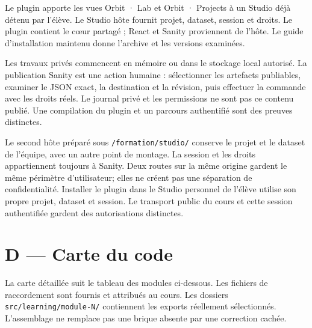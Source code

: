 \documentclass[
  canadien,
  11pt,
  a4paper,
]{report}
\begin{document}
Le plugin apporte les vues Orbit · Lab et Orbit · Projects à un Studio
déjà détenu par l'élève. Le Studio hôte fournit projet, dataset, session
et droits. Le plugin contient le cœur partagé ; React et Sanity
proviennent de l'hôte. Le guide d'installation maintenu donne l'archive
et les versions examinées.

Les travaux privés commencent en mémoire ou dans le stockage local
autorisé. La publication Sanity est une action humaine : sélectionner
les artefacts publiables, examiner le JSON exact, la destination et la
révision, puis effectuer la commande avec les droits réels. Le journal
privé et les permissions ne sont pas ce contenu publié. Une compilation
du plugin et un parcours authentifié sont des preuves distinctes.

Le second hôte préparé sous \texttt{/\allowbreak{}formation/\allowbreak{}studio/\allowbreak{}} conserve le
projet et le dataset de l'équipe, avec un autre point de montage. La
session et les droits appartiennent toujours à Sanity. Deux routes sur
la même origine gardent le même périmètre d'utilisateur; elles ne créent
pas une séparation de confidentialité. Installer le plugin dans le
Studio personnel de l'élève utilise son propre projet, dataset et
session. Le transport public du cours et cette session authentifiée
gardent des autorisations distinctes.

\section{D --- Carte du code}\label{d-carte-du-code}

La carte détaillée suit le tableau des modules ci-dessous. Les fichiers
de raccordement sont fournis et attribués au cours. Les dossiers
\texttt{src/\allowbreak{}learning/\allowbreak{}module-N/\allowbreak{}} contiennent les exports réellement
sélectionnés. L'assemblage ne remplace pas une brique absente par une
correction cachée.
\end{document}
